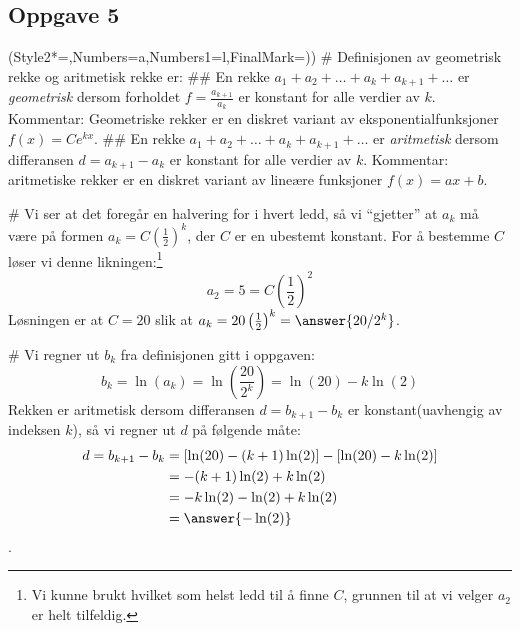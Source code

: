 \subsection*{Oppgave 5}
\begin{easylist}[enumerate]
	\ListProperties(Style2*=,Numbers=a,Numbers1=l,FinalMark={)})
	# Definisjonen av geometrisk rekke og aritmetisk rekke er:
	## En rekke $a_1 + a_2 + \dots + a_k + a_{k+1} + \dots$ er \emph{geometrisk} dersom forholdet $f = \frac{a_{k+1}}{a_k}$ er konstant for alle verdier av $k$. Kommentar: Geometriske rekker er en diskret variant av eksponentialfunksjoner $f(x) = Ce^{kx}$.
	## En rekke $a_1 + a_2 + \dots + a_k + a_{k+1} + \dots$ er \emph{aritmetisk} dersom differansen $d = a_{k+1} - a_k$ er konstant for alle verdier av $k$. Kommentar: aritmetiske rekker er en diskret variant av lineære funksjoner $f(x) = ax + b$.
	
	# Vi ser at det foregår en halvering for i hvert ledd, så vi ``gjetter'' at $a_k$ må være på formen $a_k = C \left(\frac{1}{2}\right)^k$, der $C$ er en ubestemt konstant. For å bestemme $C$ løser vi denne likningen:\footnote{Vi kunne brukt hvilket som helst ledd til å finne $C$, grunnen til at vi velger $a_2$ er helt tilfeldig.}
	\begin{equation*}
		a_2 = 5 = C \left(\frac{1}{2}\right)^2
	\end{equation*}
	Løsningen er at $C = 20$ slik at $a_k = 20 \left(\frac{1}{2}\right)^k = \answer{20/2^k}$. 
	
	# Vi regner ut $b_k$ fra definisjonen gitt i oppgaven:
	\begin{equation*}
		b_k = \ln \left(a_k\right) = \ln \left(\frac{20}{2^k}\right) = \ln(20) - k \ln(2)
	\end{equation*}
	Rekken er aritmetisk dersom differansen $d = b_{k+1} - b_k$ er konstant(uavhengig av indeksen $k$), så vi regner ut $d$ på følgende måte:
	\begin{align*}
	d = b_{k+1} - b_k &= \left[\ln(20) - (k+1) \ln(2)\right] - \left[\ln(20) - k \ln(2)\right] \\
					&=  - (k+1) \ln(2)  + k \ln(2) \\
					&=  - k \ln(2) - \ln(2)  + k \ln(2) \\
					&=\answer{- \ln(2)}
	\end{align*}
	.
	
\end{easylist}

